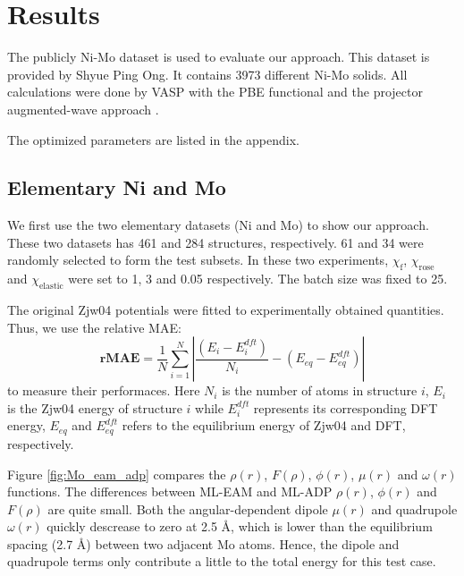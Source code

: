 \documentclass[prb,reprint]{revtex4-2}
\begin{document}
% 
%
\section{Results}
\label{sec:results}

The publicly Ni-Mo dataset \cite{SNAP} is used to evaluate our approach. This 
dataset is provided by Shyue Ping Ong. It contains 3973 different Ni-Mo solids. 
All calculations were done by VASP \cite{VASP} with the PBE \cite{PBE} 
functional and the projector augmented-wave approach \cite{PAW}. 

The optimized parameters are listed in the appendix.

% 
%
\subsection{Elementary Ni and Mo}
\label{sec:elementary}

We first use the two elementary datasets (Ni and Mo) to show our approach. These 
two datasets has 461 and 284 structures, respectively. 61 and 34 were randomly 
selected to form the test subsets. In these two experiments, 
$\chi_{\mathrm{f}}$, $\chi_{\mathrm{rose}}$ and $\chi_{\mathrm{elastic}}$ were 
set to 1, 3 and 0.05 respectively. The batch size was fixed to 25. 

The original Zjw04 potentials were fitted to experimentally obtained quantities.
Thus, we use the relative MAE:
\begin{equation}
\mathbf{rMAE} = \frac{1}{N}\sum_{i=1}^{N}{
    | \frac{(E_i - E_i^{dft})}{N_i} - (E_{eq} - E_{eq}^{dft}) |
}
\end{equation}
to measure their performaces. Here $N_i$ is the number of atoms in structure 
$i$, $E_i$ is the Zjw04 energy of structure $i$ while $E_i^{dft}$ represents its 
corresponding DFT energy, $E_{eq}$ and $E_{eq}^{dft}$ refers to the equilibrium 
energy of Zjw04 and DFT, respectively.

Figure \ref{fig:Mo_eam_adp} compares the $\rho(r)$, $F(\rho)$, $\phi(r)$, 
$\mu(r)$ and $\omega(r)$ functions. The differences between ML-EAM and ML-ADP 
$\rho(r)$, $\phi(r)$ and $F(\rho)$ are quite small. Both the angular-dependent 
dipole $\mu(r)$ and quadrupole $\omega(r)$ quickly descrease to zero at 2.5 \AA, 
which is lower than the equilibrium spacing (2.7 \AA) between two adjacent Mo 
atoms. Hence, the dipole and quadrupole terms only contribute a little to the 
total energy for this test case.
\end{document}
